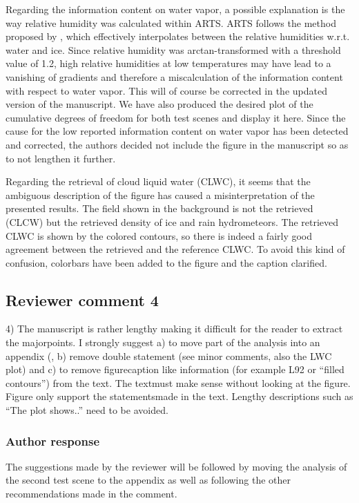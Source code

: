 \documentclass[11pt]{scrartcl}
\begin{document}
Regarding the information content on water vapor, a possible explanation is the
way relative humidity was calculated within ARTS. ARTS follows the method
proposed by \citet{bla}, which effectively interpolates between the relative
humidities w.r.t. water and ice. Since relative humidity was arctan-transformed
with a threshold value of 1.2, high relative humidities at low temperatures may
have lead to a vanishing of gradients and therefore a miscalculation of the
information content with respect to water vapor. This will of course be corrected
in the updated version of the manuscript. We have also produced the desired plot
of the cumulative degrees of freedom for both test scenes and display it here.
Since the cause for the low reported information content on water vapor has been
detected and corrected, the authors decided not include the figure in the manuscript
so as to not lengthen it further.

Regarding the retrieval of cloud liquid water (CLWC), it seems that the
ambiguous description of the figure has caused a misinterpretation of the
presented results. The field shown in the background is not the retrieved (CLCW)
but the retrieved density of ice and rain hydrometeors. The retrieved CLWC is
shown by the colored contours, so there is indeed a fairly good agreement
between the retrieved and the reference CLWC. To avoid this kind of confusion,
colorbars have been added to the figure and the caption clarified.

\subsection*{Reviewer comment 4}

4) The manuscript is rather lengthy making it difficult for the reader to
extract the majorpoints. I strongly suggest a) to move part of the analysis into
an appendix (, b) remove double statement (see minor comments, also the LWC plot)
and c) to remove figurecaption like information (for example L92 or “filled
contours”) from the text. The textmust make sense without looking at the figure.
Figure only support the statementsmade in the text. Lengthy descriptions such as
“The plot shows..” need to be avoided.

\subsubsection*{Author response}

The suggestions made by the reviewer will be followed by moving the analysis of
the second test scene to the appendix as well as following the other recommendations
made in the comment.
\end{document}
